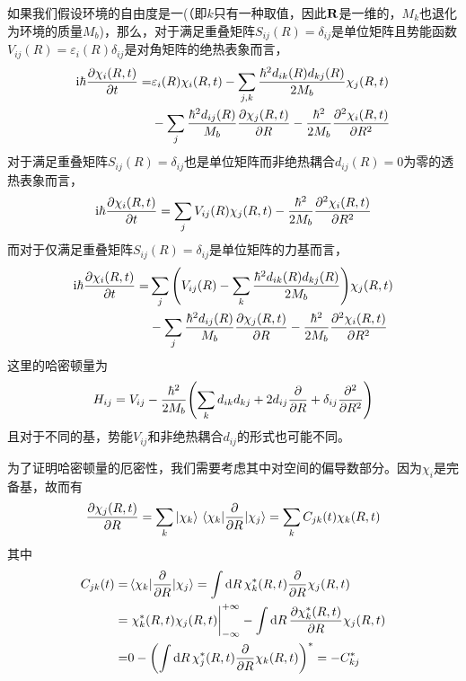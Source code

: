 \documentclass[UTF8,12pt]{article}
\begin{document}
        如果我们假设环境的自由度是一(（即$k$只有一种取值，因此$\vb{R}$是一维的，$M_k$也退化为环境的质量$M_b$)，那么，对于满足重叠矩阵$S_{ij}(R)=\delta_{ij}$是单位矩阵且势能函数$V_{ij}(R)=\varepsilon_i(R)\delta_{ij}$是对角矩阵的绝热表象而言，
        \begin{align}
            \mathrm{i}\hbar\pdv{\chi_i(R,t)}{t}=&\varepsilon_i(R)\chi_i(R,t)-\sum_{j,k}{\frac{\hbar^2d_{ik}(R)d_{kj}(R)}{2M_b}\chi_j(R,t)} \nonumber \\
            &-\sum_j{\frac{\hbar^2d_{ij}(R)}{M_b}\pdv{\chi_j(R,t)}{R}}-\frac{\hbar^2}{2M_b}\pdv[2]{\chi_i(R,t)}{R}
        \end{align}
        对于满足重叠矩阵$S_{ij}(R)=\delta_{ij}$也是单位矩阵而非绝热耦合$d_{ij}(R)=0$为零的透热表象而言，
        \begin{equation}
            \mathrm{i}\hbar\pdv{\chi_i(R,t)}{t}=\sum_j{V_{ij}(R)\chi_j(R,t)}-\frac{\hbar^2}{2M_b}\pdv[2]{\chi_i(R,t)}{R}
        \end{equation}
        而对于仅满足重叠矩阵$S_{ij}(R)=\delta_{ij}$是单位矩阵的力基而言，
        \begin{align}
            \mathrm{i}\hbar\pdv{\chi_i(R,t)}{t}=&\sum_j{\qty(V_{ij}(R)-\sum_{k}{\frac{\hbar^2d_{ik}(R)d_{kj}(R)}{2M_b}})\chi_j(R,t)} \nonumber \\
            &-\sum_j{\frac{\hbar^2d_{ij}(R)}{M_b}\pdv{\chi_j(R,t)}{R}}-\frac{\hbar^2}{2M_b}\pdv[2]{\chi_i(R,t)}{R}
        \end{align}
        这里的哈密顿量为
        \begin{equation}
            H_{ij}=V_{ij}-\frac{\hbar^2}{2M_b}\qty(\sum_k{d_{ik}d_{kj}}+2d_{ij}\pdv{R}+\delta_{ij}\pdv[2]{R})
        \end{equation}
        且对于不同的基，势能$V_{ij}$和非绝热耦合$d_{ij}$的形式也可能不同。\par
        为了证明哈密顿量的厄密性，我们需要考虑其中对空间的偏导数部分。因为${\chi_i}$是完备基，故而有
        \begin{equation}
            \pdv{\chi_j(R,t)}{R}=\sum_k{\ket{\chi_k}\mel{\chi_k}{\pdv{R}}{\chi_j}}=\sum_k{C_{jk}(t)\chi_k(R,t)}
        \end{equation}
        其中
        \begin{align}
            C_{jk}(t)=&\mel{\chi_k}{\pdv{R}}{\chi_j}=\int{\dd{R}\chi_k^*(R,t)\pdv{R}\chi_j(R,t)} \\
            =&\eval{\chi_k^*(R,t)\chi_j(R,t)}_{-\infty}^{+\infty}-\int{\dd{R}\pdv{\chi_k^*(R,t)}{R}\chi_j(R,t)} \\
            =&0-\qty(\int{\dd{R}\chi_j^*(R,t)\pdv{R}\chi_k(R,t)})^*=-C_{kj}^*
        \end{align}
\end{document}
